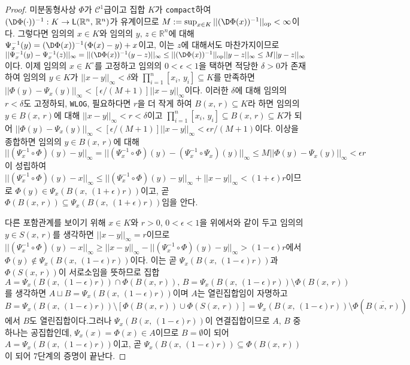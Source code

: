 \begin{proof}
    미분동형사상 $\Phi$가 $\mathcal{C}^1$급이고 집합 $K$가 \texttt{compact}하여 $(\D\Phi(\cdot))^{-1}:K\to\mathsf{L}(\mathbb{R}^n,\,\mathbb{R}^n)$가 유계이므로 $M:=\sup_{x\in K}||(\D\Phi(x))^{-1}||_\mathrm{op}<\infty$이다. 그렇다면 임의의 $x\in K$와 임의의 $y,\,z\in\mathbb{R}^n$에 대해 $\Psi_x^{-1}(y)=(\D\Phi(x))^{-1}(\Phi(x)-y)+x$이고, 이는 $z$에 대해서도 마찬가지이므로 $||\Psi_x^{-1}(y)-\Psi_x^{-1}(z)||_\infty=||(\D\Phi(x))^{-1}(y-z)||_\infty\leq||(\D\Phi(x))^{-1}||_\mathrm{op}||y-z||_\infty\leq M||y-z||_\infty$이다. 이제 임의의 $x\in K^\circ$를 고정하고 임의의 $0<\epsilon<1$을 택하면 적당한 $\delta>0$가 존재하여 임의의 $y\in K$가 $||x-y||_\infty<\delta$와 $\prod_{i=1}^n[x_i,\,y_i]\subseteq K$를 만족하면 $||\Phi(y)-\Psi_x(y)||_\infty<[\epsilon/(M+1)]||x-y||_\infty$이다. 이러한 $\delta$에 대해 임의의 $r<\delta$도 고정하되, \texttt{WLOG}, 필요하다면 $r$을 더 작게 하여 $B(x,\,r)\subseteq K$라 하면 임의의 $y\in B(x,\,r)$에 대해 $||x-y||_\infty<r<\delta$이고 $\prod_{i=1}^n[x_i,\,y_i]\subseteq B(x,\,r)\subseteq K$가 되어 $||\Phi(y)-\Psi_x(y)||_\infty<[\epsilon/(M+1)]||x-y||_\infty<\epsilon r/(M+1)$이다. 이상을 종합하면 임의의 $y\in B(x,\,r)$에 대해 $||(\Psi_x^{-1}\circ\Phi)(y)-y||_\infty=||(\Psi_x^{-1}\circ\Phi)(y)-(\Psi_x^{-1}\circ\Psi_x)(y)||_\infty\leq M||\Phi(y)-\Psi_x(y)||_\infty<\epsilon r$이 성립하여 $||(\Psi_x^{-1}\circ\Phi)(y)-x||_\infty\leq||(\Psi_x^{-1}\circ\Phi)(y)-y||_\infty+||x-y||_\infty<(1+\epsilon)r$이므로 $\Phi(y)\in\Psi_x(B(x,\,(1+\epsilon)r))$이고, 곧 $\Phi(B(x,\,r))\subseteq\Psi_x(B(x,\,(1+\epsilon)r))$임을 안다.

    다른 포함관계를 보이기 위해 $x\in K$와 $r>0$, $0<\epsilon<1$을 위에서와 같이 두고 임의의 $y\in S(x,\,r)$를 생각하면 $||x-y||_\infty=r$이므로 $||(\Psi_x^{-1}\circ\Phi)(y)-x||_\infty\geq||x-y||_\infty-||(\Psi_x^{-1}\circ\Phi)(y)-y||_\infty>(1-\epsilon)r$에서 $\Phi(y)\notin\Psi_x(B(x,\,(1-\epsilon)r))$이다. 이는 곧 $\Psi_x(B(x,\,(1-\epsilon)r))$과 $\Phi(S(x,\,r))$이 서로소임을 뜻하므로 집합 $A=\Psi_x(B(x,\,(1-\epsilon)r))\cap\Phi(B(x,\,r)),\,B=\Psi_x(B(x,\,(1-\epsilon)r))\setminus\Phi(B(x,\,r))$를 생각하면 $A\sqcup B=\Psi_x(B(x,\,(1-\epsilon)r))$이며 $A$는 열린집합임이 자명하고 $B=\Psi_x(B(x,\,(1-\epsilon)r))\setminus[\Phi(B(x,\,r))\cup\Phi(S(x,\,r))]=\Psi_x(B(x,\,(1-\epsilon)r))\setminus\Phi(\overline{B(x,\,r)})$에서 $B$도 열린집합이다.\footnotemark 그러나 $\Psi_x(B(x,\,(1-\epsilon)r))$이 연결집합이므로 $A,\,B$ 중 하나는 공집합인데, $\Psi_x(x)=\Phi(x)\in A$이므로 $B=\emptyset$이 되어 $A=\Psi_x(B(x,\,(1-\epsilon)r))$이고, 곧 $\Psi_x(B(x,\,(1-\epsilon)r))\subseteq\Phi(B(x,\,r))$이 되어 7단계의 증명이 끝난다.


\end{proof}
